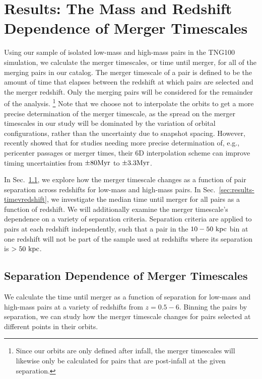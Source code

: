\documentclass[twocolumn,linenumbers]{aastex631}
\begin{document}
\section{Results: The Mass and Redshift Dependence of Merger Timescales}\label{sec:results}
    Using our sample of isolated low-mass and high-mass pairs in the TNG100 simulation, we calculate the merger timescales, or time until merger, for all of the merging pairs in our catalog. 
    The merger timescale of a pair is defined to be the amount of time that elapses between the redshift at which pairs are selected and the merger redshift.
    Only the merging pairs will be considered for the remainder of the analysis. \footnote{Since our orbits are only defined after infall, the merger timescales will likewise only be calculated for pairs that are post-infall at the given separation.}
    Note that we choose not to interpolate the orbits to get a more precise determination of the merger timescale, as the spread on the merger timescales in our study will be dominated by the variation of orbital configurations, rather than the uncertainty due to snapshot spacing. However,~\citet{Patton2024} recently showed that for studies needing more precise determination of, e.g., pericenter passages or merger times, their 6D interpolation scheme can improve timing uncertainties from $\pm80\mathrm{Myr}$ to $\pm3.3\mathrm{Myr}$.
    
    In Sec.~\ref{sec:results-timevsep}, we explore how the merger timescale changes as a function of pair separation across redshifts for low-mass and high-mass pairs. 
    In Sec.~\ref{sec:results-timevredshift}, we investigate the median time until merger for all pairs as a function of redshift. 
    We will additionally examine the merger timescale's dependence on a variety of separation criteria. 
    Separation criteria are applied to pairs at each redshift independently, such that a pair in the $10-50\,\mathrm{\,kpc}$ bin at one redshift will not be part of the sample used at redshifts where its separation is $>50\,\mathrm{\,kpc}$.



\subsection{Separation Dependence of Merger Timescales}\label{sec:results-timevsep}
    We calculate the time until merger as a function of separation for low-mass and high-mass pairs at a variety of redshifts from $z=0.5-6$. 
    Binning the pairs by separation, we can study how the merger timescale changes for pairs selected at different points in their orbits. 
    
\end{document}
